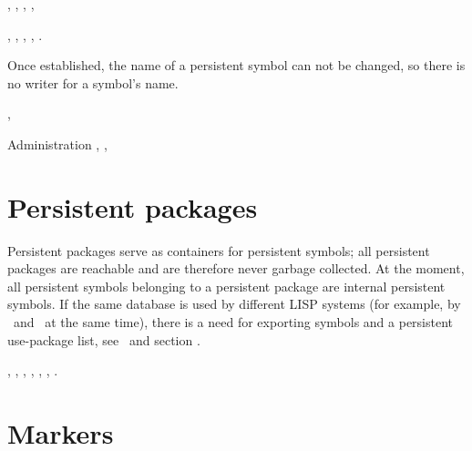 \begin{RefList}\itemsep0pt

  \Allocator {}

  \Creator {}

  \TypePredicate {}

  \ObjectStore {}

  \ObjectLoad {}

  \SlotReader {}, ,
  , ,

  \SlotWriter {}, , ,
  , .

  Once established, the name of a persistent symbol can not be
  changed, so there is no writer for a symbol's name.

  \Information {}, 

\item[Administration] , ,

\end{RefList}

\section{Persistent packages}

Persistent packages serve as containers for persistent symbols; all
persistent packages are reachable and are therefore never garbage
collected. At the moment, all persistent symbols belonging to a
persistent package are internal persistent symbols.  If the same
database is used by different LISP systems (for example, by \lwcl\ and
\allegrocl\ at the same time), there is a need for exporting symbols
and a persistent use-package list, see \ and
section .

 {}, ,
, ,
, ,
.

\section{Markers}%
\label{sec:Markers}

